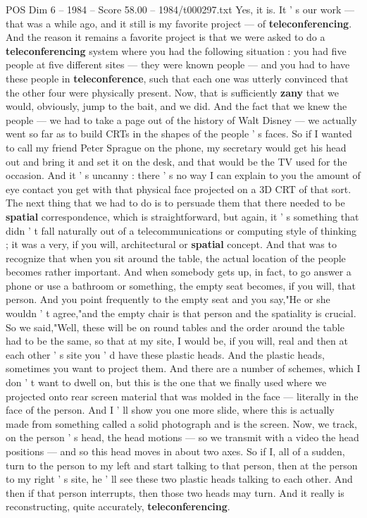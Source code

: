\begin{textsample}{POS Dim 6 – 1984 – Score 58.00 – 1984/t000297.txt}
Yes, it is.
It ' s our work — that was a while ago, and it still is my favorite project — of \textbf{teleconferencing}.
And the reason it remains a favorite project is that we were asked to do a \textbf{teleconferencing} system where you had the following situation : you had five people at five different sites — they were known people — and you had to have these people in \textbf{teleconference}, such that each one was utterly convinced that the other four were physically present.
Now, that is sufficiently \textbf{zany} that we would, obviously, jump to the bait, and we did.
And the fact that we knew the people — we had to take a page out of the history of Walt Disney — we actually went so far as to build CRTs in the shapes of the people ' s faces.
So if I wanted to call my friend Peter Sprague on the phone, my secretary would get his head out and bring it and set it on the desk, and that would be the TV used for the occasion.
And it ' s uncanny : there ' s no way I can explain to you the amount of eye contact you get with that physical face projected on a 3D CRT of that sort.
The next thing that we had to do is to persuade them that there needed to be \textbf{spatial} correspondence, which is straightforward, but again, it ' s something that didn ' t fall naturally out of a telecommunications or computing style of thinking ; it was a very, if you will, architectural or \textbf{spatial} concept.
And that was to recognize that when you sit around the table, the actual location of the people becomes rather important.
And when somebody gets up, in fact, to go answer a phone or use a bathroom or something, the empty seat becomes, if you will, that person.
And you point frequently to the empty seat and you say,"He or she wouldn ' t agree,"and the empty chair is that person and the spatiality is crucial.
So we said,"Well, these will be on round tables and the order around the table had to be the same, so that at my site, I would be, if you will, real and then at each other ' s site you ' d have these plastic heads.
And the plastic heads, sometimes you want to project them.
And there are a number of schemes, which I don ' t want to dwell on, but this is the one that we finally used where we projected onto rear screen material that was molded in the face — literally in the face of the person.
And I ' ll show you one more slide, where this is actually made from something called a solid photograph and is the screen.
Now, we track, on the person ' s head, the head motions — so we transmit with a video the head positions — and so this head moves in about two axes.
So if I, all of a sudden, turn to the person to my left and start talking to that person, then at the person to my right ' s site, he ' ll see these two plastic heads talking to each other.
And then if that person interrupts, then those two heads may turn.
And it really is reconstructing, quite accurately, \textbf{teleconferencing}.


\end{textsample}
